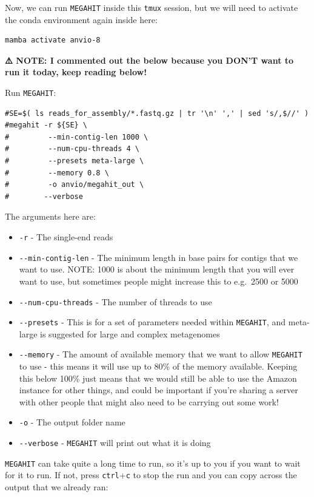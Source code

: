 \documentclass[
]{book}
\providecommand{\tightlist}{%
  \setlength{\itemsep}{0pt}\setlength{\parskip}{0pt}}
\begin{document}
Now, we can run \texttt{MEGAHIT} inside this \texttt{tmux} session, but we will need to activate the conda environment again inside here:

\begin{verbatim}
mamba activate anvio-8
\end{verbatim}

\textbf{⚠️ NOTE: I commented out the below because you DON'T want to run it today, keep reading below!}

Run \texttt{MEGAHIT}:

\begin{verbatim}
#SE=$( ls reads_for_assembly/*.fastq.gz | tr '\n' ',' | sed 's/,$//' )
#megahit -r ${SE} \
#         --min-contig-len 1000 \
#         --num-cpu-threads 4 \
#         --presets meta-large \
#         --memory 0.8 \
#         -o anvio/megahit_out \
#        --verbose
\end{verbatim}

The arguments here are:

\begin{itemize}
\tightlist
\item
  \texttt{-r} - The single-end reads
\item
  \texttt{-\/-min-contig-len} - The minimum length in base pairs for contigs that we want to use. NOTE: 1000 is about the minimum length that you will ever want to use, but sometimes people might increase this to e.g.~2500 or 5000
\item
  \texttt{-\/-num-cpu-threads} - The number of threads to use
\item
  \texttt{-\/-presets} - This is for a set of parameters needed within \texttt{MEGAHIT}, and meta-large is suggested for large and complex metagenomes
\item
  \texttt{-\/-memory} - The amount of available memory that we want to allow \texttt{MEGAHIT} to use - this means it will use up to 80\% of the memory available. Keeping this below 100\% just means that we would still be able to use the Amazon instance for other things, and could be important if you're sharing a server with other people that might also need to be carrying out some work!
\item
  \texttt{-o} - The output folder name
\item
  \texttt{-\/-verbose} - \texttt{MEGAHIT} will print out what it is doing
\end{itemize}

\texttt{MEGAHIT} can take quite a long time to run, so it's up to you if you want to wait for it to run. If not, press \texttt{ctrl}+\texttt{c} to stop the run and you can copy across the output that we already ran:
\end{document}
